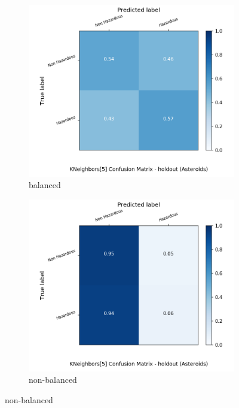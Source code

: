 \begin{figure}[H]
	\centering
	\begin{subfigure}{.5\textwidth}
		\centering
		\includegraphics[width=1.1\textwidth]{Plots/asteroids/asteroids_KNeighbors_5_balance_True_holdout.png}
		\caption{balanced}
	\end{subfigure}%
	\begin{subfigure}{.5\textwidth}
		\centering
		\includegraphics[width=1.1\textwidth]{Plots/asteroids/asteroids_KNeighbors_5_balance_False_holdout.png}
		\caption{non-balanced}
	\end{subfigure}
\end{figure}

